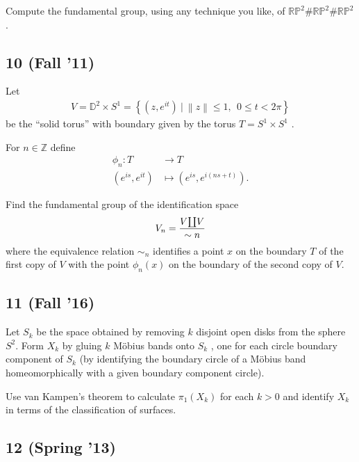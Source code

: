 Compute the fundamental group, using any technique you like, of
\({\mathbb{RP}}^2 \#{\mathbb{RP}}^2 \#{\mathbb{RP}}^2\).

\hypertarget{fall-11-1}{%
\subsection{10 (Fall '11)}\label{fall-11-1}}

Let
\begin{align*}
V = {\mathbb{D}}^2 \times S^1 = \left\{{ (z, e^{it}) {~\mathrel{\Big\vert}~}{\left\lVert {z} \right\rVert} \leq 1,~~ 0 \leq t < 2\pi}\right\}
\end{align*}
be the ``solid torus'' with boundary given by the torus
\(T = S^1 \times S^1\) .

For \(n \in {\mathbb{Z}}\) define
\begin{align*} \phi_n : T &\to T \\ (e^{is} , e^{it} ) &\mapsto (e^{is} , e^{i(ns+t)}) .\end{align*}

Find the fundamental group of the identification space
\begin{align*}
V_n = {V{\textstyle\coprod}V \over \sim n}
\end{align*}
where the equivalence relation \(\sim_n\) identifies a point \(x\) on
the boundary \(T\) of the first copy of \(V\) with the point
\(\phi_n (x)\) on the boundary of the second copy of \(V\).

\hypertarget{fall-16-3}{%
\subsection{11 (Fall '16)}\label{fall-16-3}}

Let \(S_k\) be the space obtained by removing \(k\) disjoint open disks
from the sphere \(S^2\). Form \(X_k\) by gluing \(k\) Möbius bands onto
\(S_k\) , one for each circle boundary component of \(S_k\) (by
identifying the boundary circle of a Möbius band homeomorphically with a
given boundary component circle).

Use van Kampen's theorem to calculate \(\pi_1 (X_k)\) for each \(k > 0\)
and identify \(X_k\) in terms of the classification of surfaces.

\hypertarget{spring-13-2}{%
\subsection{12 (Spring '13)}\label{spring-13-2}}

